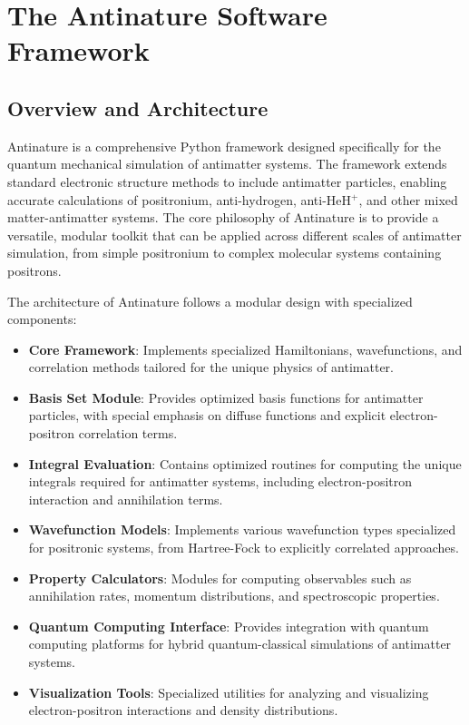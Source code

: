 \documentclass[10pt,twocolumn,a4paper]{article}
\begin{document}
\section{The Antinature Software Framework}

\subsection{Overview and Architecture}
Antinature is a comprehensive Python framework designed specifically for the quantum mechanical simulation of antimatter systems. The framework extends standard electronic structure methods to include antimatter particles, enabling accurate calculations of positronium, anti-hydrogen, anti-HeH$^+$, and other mixed matter-antimatter systems. The core philosophy of Antinature is to provide a versatile, modular toolkit that can be applied across different scales of antimatter simulation, from simple positronium to complex molecular systems containing positrons.

The architecture of Antinature follows a modular design with specialized components:

\begin{itemize}
    \item \textbf{Core Framework}: Implements specialized Hamiltonians, wavefunctions, and correlation methods tailored for the unique physics of antimatter.
    
    \item \textbf{Basis Set Module}: Provides optimized basis functions for antimatter particles, with special emphasis on diffuse functions and explicit electron-positron correlation terms.
    
    \item \textbf{Integral Evaluation}: Contains optimized routines for computing the unique integrals required for antimatter systems, including electron-positron interaction and annihilation terms.
    
    \item \textbf{Wavefunction Models}: Implements various wavefunction types specialized for positronic systems, from Hartree-Fock to explicitly correlated approaches.
    
    \item \textbf{Property Calculators}: Modules for computing observables such as annihilation rates, momentum distributions, and spectroscopic properties.
    
    \item \textbf{Quantum Computing Interface}: Provides integration with quantum computing platforms for hybrid quantum-classical simulations of antimatter systems.
    
    \item \textbf{Visualization Tools}: Specialized utilities for analyzing and visualizing electron-positron interactions and density distributions.
\end{itemize}
\end{document}

